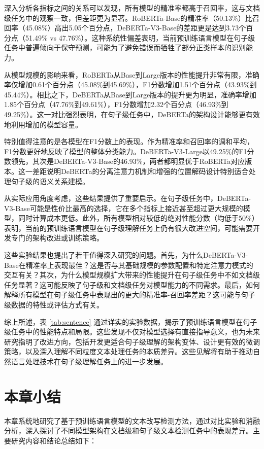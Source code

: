 深入分析各指标之间的关系可以发现，所有模型的精准率都高于召回率，这与文档级任务中的观察一致，但差距更为显著。RoBERTa-Base的精准率（50.13\%）比召回率（45.08\%）高出5.05个百分点，DeBERTa-V3-Base的差距更是达到3.73个百分点（51.49\% vs 47.76\%）。这种系统性偏差表明，当前预训练语言模型在句子级任务中普遍倾向于保守预测，可能为了避免错误而牺牲了部分正类样本的识别能力。

从模型规模的影响来看，RoBERTa从Base到Large版本的性能提升非常有限，准确率仅增加0.61个百分点（45.08\%到45.69\%），F1分数增加1.51个百分点（43.93\%到45.44\%）。相比之下，DeBERTa从Base到Large版本的提升更为明显，准确率增加1.85个百分点（47.76\%到49.61\%），F1分数增加2.32个百分点（46.93\%到49.25\%）。这一对比强烈表明，在句子级任务中，DeBERTa的架构设计能够更有效地利用增加的模型容量。

特别值得注意的是各模型在F1分数上的表现。作为精准率和召回率的调和平均，F1分数更好地反映了模型的整体分类能力。DeBERTa-V3-Large以49.25\%的F1分数领先，其次是DeBERTa-V3-Base的46.93\%，两者都明显优于RoBERTa对应版本。这一差距说明DeBERTa的分离注意力机制和增强的位置解码设计特别适合处理句子级的语义关系建模。

从实际应用角度考虑，这些结果提供了重要启示。在句子级任务中，DeBERTa-V3-Base可能是性价比最高的选择，它在多个指标上接近甚至超过更大规模的模型，同时计算成本更低。此外，所有模型相对较低的绝对性能分数（均低于50\%）表明，当前的预训练语言模型在句子级理解任务上仍有很大改进空间，可能需要开发专门的架构改进或训练策略。

这些实验结果也提出了若干值得深入研究的问题。首先，为什么DeBERTa-V3-Base在精准率上表现最佳？这是否与其基础规模的参数配置和特定注意力模式的交互有关？其次，为什么模型规模扩大带来的性能提升在句子级任务中不如文档级任务显著？这可能反映了句子级和文档级任务对模型能力的不同需求。最后，如何解释所有模型在句子级任务中表现出的更大的精准率-召回率差距？这可能与句子级数据的特性或评估方式有关。

综上所述，表 \ref{tab:sentence} 通过详实的实验数据，揭示了预训练语言模型在句子级任务中的性能特点和局限。这些发现不仅对模型选择有直接指导意义，也为未来研究指明了改进方向，包括开发更适合句子级理解的架构变体、设计更有效的微调策略，以及深入理解不同粒度文本处理任务的本质差异。这些见解将有助于推动自然语言处理技术在句子级理解任务上的进一步发展。

\section{本章小结}
\label{sec:method-conclusion}

本章系统地研究了基于预训练语言模型的文本改写检测方法，通过对比实验和消融分析，深入探讨了不同模型架构在文档级和句子级文本检测任务中的表现差异。主要研究内容和结论总结如下：

